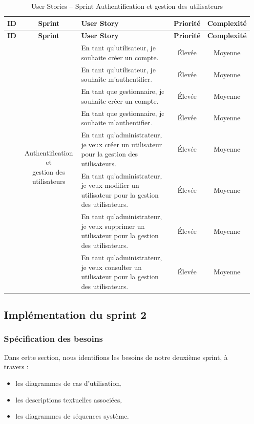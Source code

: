 \renewcommand{\arraystretch}{1.6}
\setlength{\tabcolsep}{5pt}
\begin{longtable}{|c|c|m{7cm}|c|c|}
  \caption{User Stories – Sprint Authentification et gestion des utilisateurs} \\
  \hline
  \textbf{ID} & \textbf{Sprint} & \textbf{User Story} & \textbf{Priorité} & \textbf{Complexité} \\
  \hline
  \endfirsthead
  
  \hline
  \textbf{ID} & \textbf{Sprint} & \textbf{User Story} & \textbf{Priorité} & \textbf{Complexité} \\
  \hline
  \endhead
  
  \hline
  \endfoot
  
  \hline
  \endlastfoot
  
  \multirow{8}{*}{2} & \multirow{8}{*}{\parbox{3cm}{\centering Authentification et\\ gestion des utilisateurs}} 
  & En tant qu'utilisateur, je souhaite créer un compte. & Élevée & Moyenne \\
  \cline{3-5}
  && En tant qu'utilisateur, je souhaite m’authentifier. & Élevée & Moyenne \\
  \cline{3-5}
  && En tant que gestionnaire, je souhaite créer un compte. & Élevée & Moyenne \\
  \cline{3-5}
  && En tant que gestionnaire, je souhaite m’authentifier. & Élevée & Moyenne \\
  \cline{3-5}
  && En tant qu’administrateur, je veux créer un utilisateur pour la gestion des utilisateurs. & Élevée & Moyenne \\
  \cline{3-5}
  && En tant qu’administrateur, je veux modifier un utilisateur pour la gestion des utilisateurs. & Élevée & Moyenne \\
  \cline{3-5}
  && En tant qu’administrateur, je veux supprimer un utilisateur pour la gestion des utilisateurs. & Élevée & Moyenne \\
  \cline{3-5}
  && En tant qu’administrateur, je veux consulter un utilisateur pour la gestion des utilisateurs. & Élevée & Moyenne \\
  \hline
  \end{longtable}

\subsection{Implémentation du sprint 2}
\subsubsection{Spécification des besoins}
Dans cette section, nous identifions les besoins de notre deuxième sprint, à travers :
\begin{itemize}
    \item les diagrammes de cas d'utilisation,
    \item les descriptions textuelles associées,
    \item les diagrammes de séquences système.
\end{itemize}

